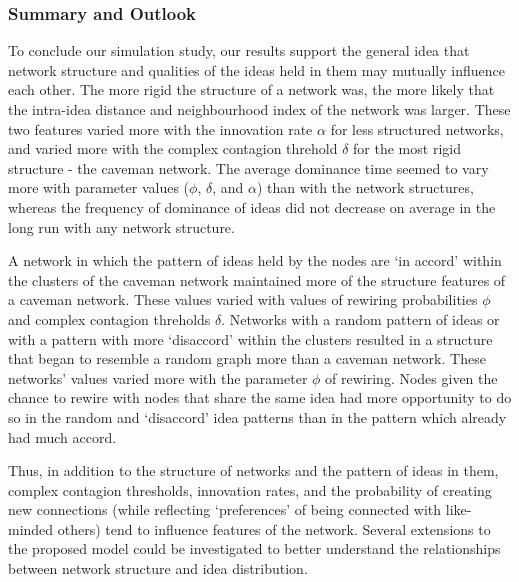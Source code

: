 \documentclass{beamer}
\begin{document}
%
\begin{frame}
\frametitle{Summary and Outlook}
To conclude our simulation study, our results support the general idea that network structure and qualities of the ideas held in them may mutually influence each other. The more rigid the structure of a network was, the more likely that the intra-idea distance and neighbourhood index of the network was larger. These two features varied more with the innovation rate $\alpha$ for less structured networks, and varied more with the complex contagion threhold $\delta$ for the most rigid structure - the caveman network. The average dominance time seemed to vary more with parameter values ($\phi$, $\delta$, and $\alpha$) than with the network structures, whereas the frequency of dominance of ideas did not decrease on average in the long run with any network structure.

A network in which the pattern of ideas held by the nodes are `in accord' within the clusters of the caveman network maintained more of the structure features of a caveman network. These values varied with values of rewiring probabilities $\phi$ and complex contagion threholds $\delta$. Networks with a random pattern of ideas or with a pattern with more `disaccord' within the clusters resulted in a structure that began to resemble a random graph more than a caveman network. These networks' values varied more with the parameter $\phi$ of rewiring. Nodes given the chance to rewire with nodes that share the same idea had more opportunity to do so in the random and `disaccord' idea patterns than in the pattern which already had much accord.

Thus, in addition to the structure of networks and the pattern of ideas in them, complex contagion thresholds, innovation rates, and the probability of creating new connections (while reflecting `preferences' of being connected with like-minded others) tend to influence features of the network. Several extensions to the proposed model could be investigated to better understand the relationships between network structure and idea distribution.
\end{frame}
%
\end{document}
